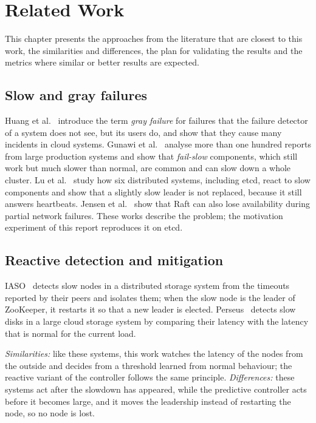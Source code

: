 \documentclass[11pt,a4paper]{article}
\begin{document}
\section{Related Work}

This chapter presents the approaches from the literature that are closest to this work, the similarities and differences, the plan for validating the results and the metrics where similar or better results are expected.

\subsection{Slow and gray failures}

Huang et al.~\cite{grayfailure} introduce the term \emph{gray failure} for failures that the failure detector of a system does not see, but its users do, and show that they cause many incidents in cloud systems. Gunawi et al.~\cite{failslow} analyse more than one hundred reports from large production systems and show that \emph{fail-slow} components, which still work but much slower than normal, are common and can slow down a whole cluster. Lu et al.~\cite{onesize} study how six distributed systems, including etcd, react to slow components and show that a slightly slow leader is not replaced, because it still answers heartbeats. Jensen et al.~\cite{raftpartial} show that Raft can also lose availability during partial network failures. These works describe the problem; the motivation experiment of this report reproduces it on etcd.

\subsection{Reactive detection and mitigation}

IASO~\cite{iaso} detects slow nodes in a distributed storage system from the timeouts reported by their peers and isolates them; when the slow node is the leader of ZooKeeper, it restarts it so that a new leader is elected. Perseus~\cite{perseus} detects slow disks in a large cloud storage system by comparing their latency with the latency that is normal for the current load.

\emph{Similarities:} like these systems, this work watches the latency of the nodes from the outside and decides from a threshold learned from normal behaviour; the reactive variant of the controller follows the same principle. \emph{Differences:} these systems act after the slowdown has appeared, while the predictive controller acts before it becomes large, and it moves the leadership instead of restarting the node, so no node is lost.
\end{document}
